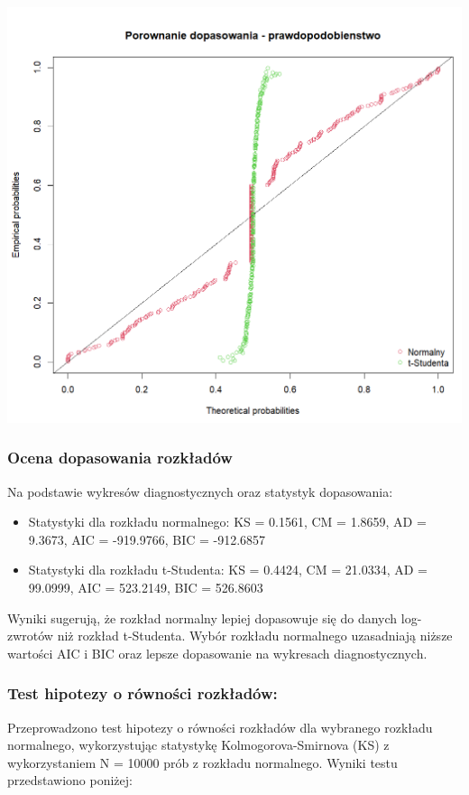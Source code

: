 \documentclass[a4paper,11pt]{article}
\begin{document}
\centerline{\includegraphics[width=14cm]{./Janek/dopasowanie pradopodobienstwo.png}} 

\subsubsection{Ocena dopasowania rozkładów}

Na podstawie wykresów diagnostycznych oraz statystyk dopasowania:
\begin{itemize}
    \item Statystyki dla rozkładu normalnego: KS = 0.1561, CM = 1.8659, AD = 9.3673, AIC = -919.9766, BIC = -912.6857
    \item Statystyki dla rozkładu t-Studenta: KS = 0.4424, CM = 21.0334, AD = 99.0999, AIC = 523.2149, BIC = 526.8603
\end{itemize}

Wyniki sugerują, że rozkład normalny lepiej dopasowuje się do danych log-zwrotów niż rozkład t-Studenta. Wybór rozkładu normalnego uzasadniają niższe wartości AIC i BIC oraz lepsze dopasowanie na wykresach diagnostycznych.

\subsubsection{Test hipotezy o równości rozkładów:}

Przeprowadzono test hipotezy o równości rozkładów dla wybranego rozkładu normalnego, wykorzystując statystykę Kolmogorova-Smirnova (KS) z wykorzystaniem N = 10000 prób z rozkładu normalnego. Wyniki testu przedstawiono poniżej:
\end{document}
